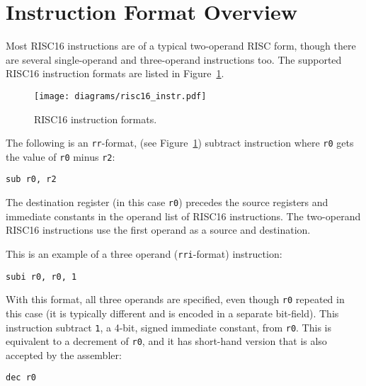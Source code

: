 \section{Instruction Format Overview}

Most RISC16 instructions are of a typical two-operand RISC form, though there are
several single-operand and three-operand instructions too. The supported RISC16
instruction formats are listed in Figure~\ref{RISCPROG_Instruction_Formats}.

\begin{figure}[h!]
\begin{center}
\texttt{[image: diagrams/risc16\_instr.pdf]}
\caption[RISC16 instruction formats]{RISC16 instruction formats.}
\label{RISCPROG_Instruction_Formats}
\end{center}
\end{figure}

The following is an \texttt{rr}-format, (see
Figure~\ref{RISCPROG_Instruction_Formats}) subtract instruction where \texttt{r0}
gets the value of \texttt{r0} minus \texttt{r2}:

\begin{center}
\begin{minipage}{0.5\linewidth}
\texttt{sub r0, r2}
\end{minipage}
\end{center}

The destination register (in this case \texttt{r0}) precedes the source registers
and immediate constants in the operand list of RISC16 instructions. The
two-operand RISC16 instructions use the first operand as a source and
destination.

This is an example of a three operand (\texttt{rri}-format) instruction:

\begin{center}
\begin{minipage}{0.5\linewidth}
\texttt{subi r0, r0, 1}
\end{minipage}
\end{center}

With this format, all three operands are specified, even though \texttt{r0}
repeated in this case (it is typically different and is encoded in a separate
bit-field). This instruction subtract \texttt{1}, a 4-bit, signed immediate
constant, from \texttt{r0}. This is equivalent to a decrement of \texttt{r0}, and
it has short-hand version that is also accepted by the assembler:

\begin{center}
\begin{minipage}{0.5\linewidth}
\texttt{dec r0}
\end{minipage}
\end{center}

